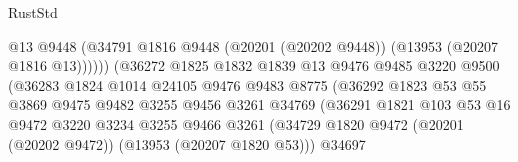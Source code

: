 \begin{lexlean}{RustStd}
\begin{coremodule}
                                            @13
                                            @9448
                                            (@34791
                                              @1816
                                              @9448
                                              (@20201 (@20202 @9448))
                                              (@13953 (@20207 @1816 @13))))))
                                      (@36272
                                        @1825
                                        @1832
                                        @1839
                                        @13
                                        @9476
                                        @9485
                                        @3220
                                        @9500
                                        (@36283
                                          @1824
                                          @1014
                                          @24105
                                          @9476
                                          @9483
                                          @8775
                                          (@36292
                                            @1823
                                            @53
                                            @55
                                            @3869
                                            @9475
                                            @9482
                                            @3255
                                            @9456
                                            @3261
                                            @34769
                                            (@36291
                                              @1821
                                              @103
                                              @53
                                              @16
                                              @9472
                                              @3220
                                              @3234
                                              @3255
                                              @9466
                                              @3261
                                              (@34729
                                                @1820
                                                @9472
                                                (@20201 (@20202 @9472))
                                                (@13953 (@20207 @1820 @53)))
                                              @34697

\end{coremodule}
\end{lexlean}

